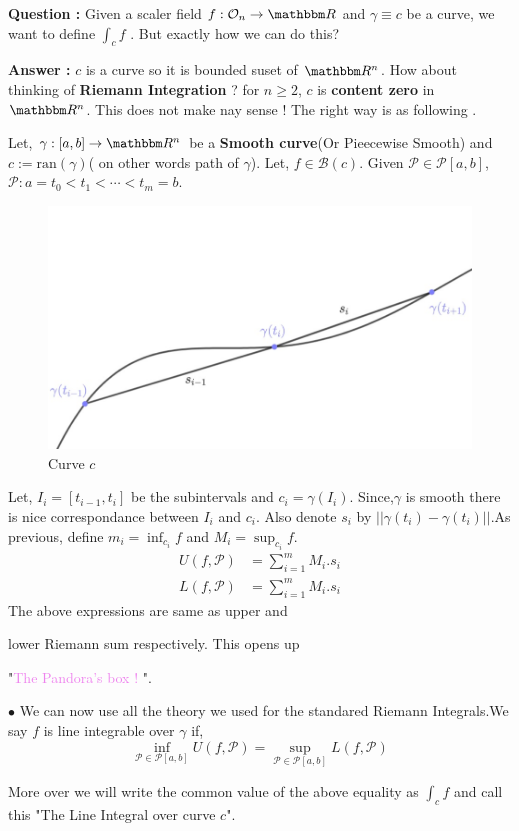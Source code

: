 \documentclass[Analysis-3]{subfiles}
\begin{document}
\textbf{Question :} Given a scaler field $f : \mathcal{O}_n \to \R$ and $\gamma \equiv c$ be a curve, we want to define $\int_c f$ . But exactly how we can do this? 

\textbf{Answer :} $c$ is a curve so it is bounded suset of $\R^n$. How about thinking of \textbf{Riemann Integration} ? for $n \ge 2$, $c$ is \textbf{content zero} in $\R^n$. This does not make nay sense ! The right way is as following .

\vspace*{0.5cm}

Let, $\gamma :[a,b]\to \R^n$ be a \textbf{Smooth curve}(Or Pieecewise Smooth) and $c:= \text{ran}(\gamma)$( on other words path of $\gamma$). Let, $f \in \mathscr{B}(c)$. Given $\mathcal{P} \in \mathscr{P}[a,b]$, $\mathcal{P} : a = t_0<t_1<\cdots <t_m = b$.
  
\vspace{0.2cm}

\begin{figure}
    \centering
    \includegraphics[width=.98\linewidth]{figures/lec-23.1.png}
    \caption{Curve $c$}
\end{figure}
Let, $I_i = [t_{i-1},t_i]$ be the subintervals and $c_i = \gamma(I_i)$. 
Since,$\gamma$ is smooth there is nice correspondance between $I_i$ and $c_i$. Also denote $s_i$ by $||\gamma(t_i) - \gamma(t_i)||$.As previous, define $m_i = \inf_{c_i}f$ and $M_i = \sup_{c_i}f$.
\begin{align*}
    U(f,\mathcal{P}) &= \sum_{i=1}^{m}M_i.s_i \\
    L(f,\mathcal{P}) &= \sum_{i=1}^{m}M_i.s_i 
\end{align*}
The above expressions are same as upper and \vspace{0.05cm} 

lower Riemann sum respectively. This opens up 

"\textcolor{violet}{The Pandora's box !} ".
\vspace{0.3cm}

$\bullet$ We can now use all the theory we used for the standared Riemann Integrals.We say $f$ is line integrable over $\gamma$ if, 
\[\inf_{\mathcal{P} \in \mathscr{P}[a,b]} U(f,\mathcal{P}) = \sup_{\mathcal{P} \in \mathscr{P}[a,b]} L(f,\mathcal{P})\]

More over we will write the common value of the above equality as $\int_c f$ and call this "The Line Integral over curve $c$".
\end{document}
